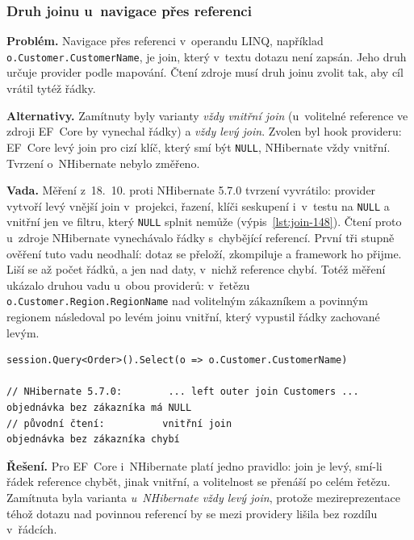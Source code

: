 \subsubsection*{Druh joinu u~navigace přes referenci}

\textbf{Problém.} Navigace přes referenci v~operandu LINQ, například \texttt{o.Customer.CustomerName}, je join, který v~textu dotazu není zapsán. Jeho druh určuje provider podle mapování. Čtení zdroje musí druh joinu zvolit tak, aby cíl vrátil tytéž řádky.

\textbf{Alternativy.} Zamítnuty byly varianty \emph{vždy vnitřní join} (u~volitelné reference ve zdroji EF~Core by vynechal řádky) a \emph{vždy levý join}. Zvolen byl hook provideru: EF~Core levý join pro cizí klíč, který smí být \texttt{NULL}, NHibernate vždy vnitřní. Tvrzení o~NHibernate nebylo změřeno.

\textbf{Vada.} Měření z~18.~10. proti NHibernate 5.7.0 tvrzení vyvrátilo: provider vytvoří levý vnější join v~projekci, řazení, klíči seskupení i~v~testu na \texttt{NULL} a vnitřní jen ve filtru, který \texttt{NULL} splnit nemůže (výpis~\ref{lst:join-148}). Čtení proto u~zdroje NHibernate vynechávalo řádky s~chybějící referencí. První tři stupně ověření tuto vadu neodhalí: dotaz se přeloží, zkompiluje a framework ho přijme. Liší se až počet řádků, a jen nad daty, v~nichž reference chybí. Totéž měření ukázalo druhou vadu u~obou providerů: v~řetězu \texttt{o.Customer.Region.RegionName} nad volitelným zákazníkem a povinným regionem následoval po levém joinu vnitřní, který vypustil řádky zachované levým.

\noindent\begin{minipage}{\linewidth}
\begin{lstlisting}[language={[Sharp]C},caption={Navigace přes volitelnou referenci: co vrací zdroj a co z~něj dělalo původní čtení.},label={lst:join-148}]
session.Query<Order>().Select(o => o.Customer.CustomerName)

// NHibernate 5.7.0:        ... left outer join Customers ...  objednávka bez zákazníka má NULL
// původní čtení:          vnitřní join                       objednávka bez zákazníka chybí
\end{lstlisting}
\end{minipage}

\textbf{Řešení.} Pro EF~Core i~NHibernate platí jedno pravidlo: join je levý, smí-li řádek reference chybět, jinak vnitřní, a volitelnost se přenáší po celém řetězu. Zamítnuta byla varianta \emph{u~NHibernate vždy levý join}, protože mezireprezentace téhož dotazu nad povinnou referencí by se mezi providery lišila bez rozdílu v~řádcích.

